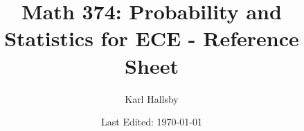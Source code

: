 



\DeclareMathOperator{\EventClass}{\mathcal{F}}
\DeclareMathOperator{\Prob}{\operatorname{P}}
\DeclareMathOperator{\ExpectedValue}{\operatorname{\mathbb{E}}}
\DeclareMathOperator{\Variance}{\operatorname{VAR}}
\DeclareMathOperator{\StdDev}{\operatorname{STD}}
\DeclareMathOperator{\Covariance}{\operatorname{Cov}}
\DeclareMathOperator{\DrawnIID}{\overset{\text{iid}}{\DrawnFrom}}
\DeclareMathOperator{\Bias}{\operatorname{B}}
\DeclareMathOperator{\MeanSqErr} {\operatorname{MSE}}
\DeclareMathOperator{\Likelihood}{\mathcal{L}}
\DeclareMathOperator{\MaxLikeEstim}{\operatorname{MLE}}

\DeclareMathOperator{\Given}{\vert}
\DeclareMathOperator{\DrawnFrom}{\sim}

\begin{titlepage}
  \title{Math 374: Probability and Statistics for ECE - Reference Sheet}
  \author{Karl Hallsby}
  \date{Last Edited: \today}
\end{titlepage}


\maketitle
{} %
\tableofcontents
\clearpage
{} %







